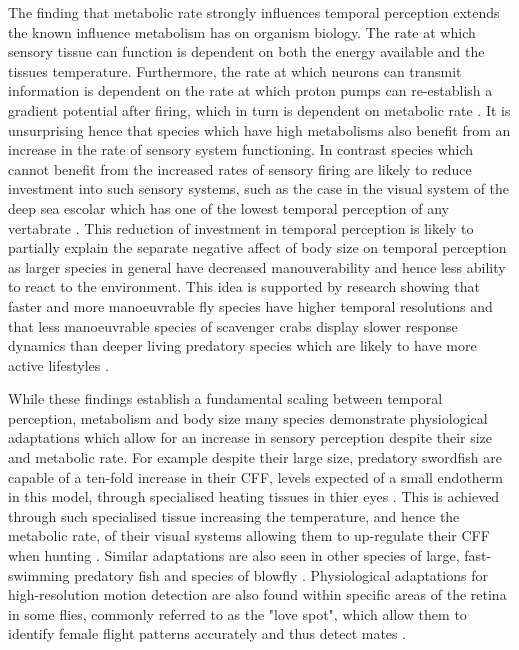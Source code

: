 The finding that metabolic rate strongly influences temporal perception extends the known influence metabolism has on organism biology. The rate at which sensory tissue can function is dependent on both the energy available and the tissues temperature. Furthermore, the rate at which neurons can transmit information is dependent on the rate at which proton pumps can re-establish a gradient potential after firing, which in turn is dependent on metabolic rate \citep{laughlin2001energy}. It is unsurprising hence that species which have high metabolisms also benefit from an increase in the rate of sensory system functioning. In contrast species which cannot benefit from the increased rates of sensory firing are likely to reduce investment into such sensory systems, such as the case in the visual system of the deep sea escolar which has one of the lowest temporal perception of any vertabrate \citep{landgren2014visual}. This reduction of investment in temporal perception is likely to partially explain the separate negative affect of body size on temporal perception as larger species in general have decreased manouverability \citep{heglund1988speed,dudley2002mechanisms,biewener2003animal,sato2007stroke,vogel2008modes,hedrick2011damping,watanabe2012slowest} and hence less ability to react to the environment. This idea is supported by research showing that faster and more manoeuvrable fly species have higher temporal resolutions \citep{laughlin1993fast} and that less manoeuvrable species of scavenger crabs display slower response dynamics than deeper living predatory species which are likely to have more active lifestyles \citep{frank2012light}. 


While these findings establish a fundamental scaling between temporal perception, metabolism and body size many species demonstrate physiological adaptations which allow for an increase in sensory perception despite their size and metabolic rate. For example despite their large size, predatory swordfish are capable of a ten-fold increase in their CFF, levels expected of a small endotherm in this model, through specialised heating tissues in thier eyes \citep{fritsches2005warm}. This is achieved through such specialised tissue increasing the temperature, and hence the metabolic rate, of their visual systems allowing them to up-regulate their CFF when hunting \citep{fritsches2005warm}. Similar adaptations are also seen in other species of large, fast-swimming predatory fish \citep{carey1982brain,block1985warm,Wegner15052015} and species of blowfly \citep{tatler2000temperature}. Physiological adaptations for high-resolution motion detection are also found within specific areas of the retina in some flies, commonly referred to as the "love spot", which allow them to identify female flight patterns accurately and thus detect mates \citep{land1974chasing}. 

